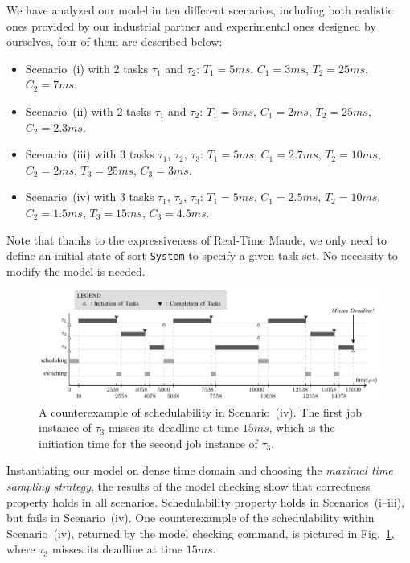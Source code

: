 \documentclass[journal]{IEEEtranTIE}
\begin{document}
We have analyzed our model in ten different scenarios, including both
realistic ones provided by our industrial partner and experimental
ones designed by ourselves, four of them are described below:
\begin{itemize}
\item Scenario~(i) with 2 tasks $\tau_1$ and $\tau_2$: $T_1=5ms$,
  $C_1=3ms$, $T_2=25ms$, $C_2=7ms$.
\item Scenario~(ii) with 2 tasks $\tau_1$ and $\tau_2$: $T_1=5ms$,
  $C_1=2ms$, $T_2=25ms$, $C_2=2.3ms$.
\item Scenario~(iii) with 3 tasks $\tau_1$, $\tau_2$, $\tau_3$:
  $T_1=5ms$, $C_1=2.7ms$, $T_2=10ms$, $C_2=2ms$, $T_3=25ms$,
  $C_3=3ms$.
\item Scenario~(iv) with 3 tasks $\tau_1$, $\tau_2$, $\tau_3$:
  $T_1=5ms$, $C_1=2.5ms$, $T_2=10ms$, $C_2=1.5ms$,
  $T_3=15ms$, $C_3=4.5ms$.
\end{itemize}
Note that thanks to the expressiveness of Real-Time Maude, we
only need to define an initial state of sort \verb|System| to specify
a given task set. No necessity to modify the model is needed.


\begin{figure}[!t]
\centering
\includegraphics{FIG3_15-TIE-3480.pdf}
\caption{A counterexample of schedulability in Scenario~(iv). The first
  job instance of $\tau_3$ misses its deadline at time $15ms$, which
  is the initiation time for the second job instance of $\tau_3$.}
\label{f:counterexample}
\end{figure}

Instantiating our model on dense time domain and choosing the
\emph{maximal time sampling strategy}, the results of the model
checking show that correctness property holds in all scenarios.
Schedulability property holds in Scenarios~(i--iii), but fails in
Scenario~(iv).  One counterexample of the schedulability within
Scenario~(iv), returned by the model checking command, is pictured in
Fig.~\ref{f:counterexample}, where $\tau_3$ misses its deadline at
time $15ms$.
\end{document}
